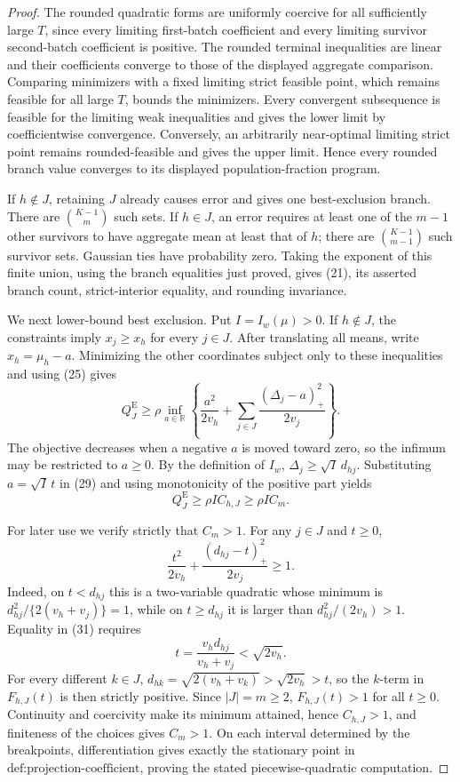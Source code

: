 \documentclass{article}
\begin{document}
\begin{proof}
The rounded quadratic forms are uniformly coercive for all sufficiently large \(T\), since every limiting first-batch coefficient and every limiting survivor second-batch coefficient is positive. The rounded terminal inequalities are linear and their coefficients converge to those of the displayed aggregate comparison. Comparing minimizers with a fixed limiting strict feasible point, which remains feasible for all large \(T\), bounds the minimizers. Every convergent subsequence is feasible for the limiting weak inequalities and gives the lower limit by coefficientwise convergence. Conversely, an arbitrarily near-optimal limiting strict point remains rounded-feasible and gives the upper limit. Hence every rounded branch value converges to its displayed population-fraction program.

If \(h\notin J\), retaining \(J\) already causes error and gives one best-exclusion branch. There are \(\binom{K-1}{m}\) such sets. If \(h\in J\), an error requires at least one of the \(m-1\) other survivors to have aggregate mean at least that of \(h\); there are \(\binom{K-1}{m-1}\) such survivor sets. Gaussian ties have probability zero. Taking the exponent of this finite union, using the branch equalities just proved, gives (21), its asserted branch count, strict-interior equality, and rounding invariance.

We next lower-bound best exclusion. Put \(I=I_w(\mu)>0\). If \(h\notin J\), the constraints imply \(x_j\ge x_h\) for every \(j\in J\). After translating all means, write \(x_h=\mu_h-a\). Minimizing the other coordinates subject only to these inequalities and using (25) gives
\[
 Q_J^{\mathrm E}\ge \rho\inf_{a\in\mathbb R}
 \left\{\frac{a^2}{2v_h}+\sum_{j\in J}\frac{(\Delta_j-a)_+^2}{2v_j}\right\}. \tag{29}
\]
The objective decreases when a negative \(a\) is moved toward zero, so the infimum may be restricted to \(a\ge0\). By the definition of \(I_w\), \(\Delta_j\ge\sqrt I\,d_{hj}\). Substituting \(a=\sqrt I\,t\) in (29) and using monotonicity of the positive part yields
\[
 Q_J^{\mathrm E}\ge \rho I C_{h,J}\ge \rho I C_m. \tag{30}
\]

For later use we verify strictly that \(C_m>1\). For any \(j\in J\) and \(t\ge0\),
\[
 \frac{t^2}{2v_h}+\frac{(d_{hj}-t)_+^2}{2v_j}\ge1. \tag{31}
\]
Indeed, on \(t<d_{hj}\) this is a two-variable quadratic whose minimum is \(d_{hj}^2/\{2(v_h+v_j)\}=1\), while on \(t\ge d_{hj}\) it is larger than \(d_{hj}^2/(2v_h)>1\). Equality in (31) requires
\[
 t=\frac{v_h d_{hj}}{v_h+v_j}<\sqrt{2v_h}.
\]
For every different \(k\in J\), \(d_{hk}=\sqrt{2(v_h+v_k)}>\sqrt{2v_h}>t\), so the \(k\)-term in \(F_{h,J}(t)\) is then strictly positive. Since \(|J|=m\ge2\), \(F_{h,J}(t)>1\) for all \(t\ge0\). Continuity and coercivity make its minimum attained, hence \(C_{h,J}>1\), and finiteness of the choices gives \(C_m>1\). On each interval determined by the breakpoints, differentiation gives exactly the stationary point in \(\text{def:projection-coefficient}\), proving the stated piecewise-quadratic computation.


\end{proof}
\end{document}
